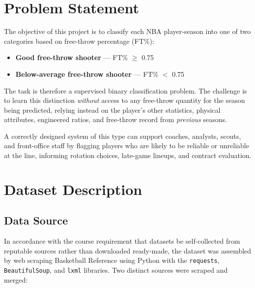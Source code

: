 \documentclass[conference]{IEEEtran}
\begin{document}

\section{Problem Statement}

The objective of this project is to classify each NBA player-season into one of two categories based on free-throw percentage (FT\%):

\begin{itemize}
\item \textbf{Good free-throw shooter} --- FT\% $\geq$ 0.75
\item \textbf{Below-average free-throw shooter} --- FT\% $<$ 0.75
\end{itemize}

The task is therefore a supervised binary classification problem. The challenge is to learn this distinction \textit{without} access to any free-throw quantity for the season being predicted, relying instead on the player's other statistics, physical attributes, engineered ratios, and free-throw record from \textit{previous} seasons.

A correctly designed system of this type can support coaches, analysts, scouts, and front-office staff by flagging players who are likely to be reliable or unreliable at the line, informing rotation choices, late-game lineups, and contract evaluation.


\section{Dataset Description}

\subsection{Data Source}

In accordance with the course requirement that datasets be self-collected from reputable sources rather than downloaded ready-made, the dataset was assembled by web scraping Basketball Reference using Python with the \texttt{requests}, \texttt{BeautifulSoup}, and \texttt{lxml} libraries. Two distinct sources were scraped and merged:
\end{document}

